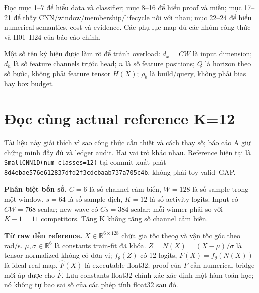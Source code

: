 \documentclass[11pt,a4paper]{article}
\newcommand{\R}{\mathbb R}
\newcommand{\code}[1]{{\small\ttfamily\nolinkurl{#1}}}
\theoremstyle{definition}
\begin{document}
Đọc mục 1--7 để hiểu data và classifier; mục 8--16 để hiểu proof và miền;
mục 17--21 để thấy CNN/window/membership/lifecycle nối với nhau; mục
22--24 để hiểu numerical semantics, cost và evidence. Các phụ lục map đủ
các nhóm công thức và H01--H24 của báo cáo chính.

Một số tên ký hiệu được làm rõ để tránh overload: $d_x=CW$ là input
dimension; $d_h$ là số feature channels trước head; $n$ là số feature
positions; $Q$ là horizon theo số bước, không phải feature tensor $H(X)$;
$\rho_b$ là build/query, không phải bias hay box budget.

\begingroup
\small
\setlength{\parskip}{0pt}
\tableofcontents
\endgroup
\clearpage

\section*{Đọc cùng actual reference K=12}
Tài liệu này giải thích vì sao công thức cần thiết và cách thay số; báo cáo
A giữ chứng minh đầy đủ và ledger audit. Hai vai trò khác nhau.
Reference hiện tại là \code{SmallCNN1D(num_classes=12)} tại commit xuất phát
\code{8d4ebae576e612837dfd2f3cdcbaab737a705c4b}, không phải toy valid--GAP.

\textbf{Phân biệt bốn số.} $C=6$ là số channel cảm biến, $W=128$ là số
sample trong một window, $s=64$ là số sample dịch, $K=12$ là số activity
logits. Input có $CW=768$ scalar; new wave có $Cs=384$ scalar; mỗi winner
phải so với $K-1=11$ competitors. Tăng K không tăng số channel cảm biến.

\textbf{Từ raw đến reference.} $X\in\R^{6\times128}$ chứa gia tốc theo$g$
và vận tốc góc theo rad/s. $\mu,\sigma\in\R^6$ là constants train-fit đã
khóa. $Z=N(X)=(X-\mu)/\sigma$ là tensor normalized không có đơn vị;
$f_\theta(Z)$ có 12 logits, $F(X)=f_\theta(N(X))$ là ideal real map.
$\widehat F(X)$ là executable float32; proof của $F$ cần numerical bridge
mới áp được cho $\widehat F$. Lưu constants float32 chính xác xác định một
hàm toán học; nó không tự bao sai số của các phép tính float32 sau đó.
\end{document}
